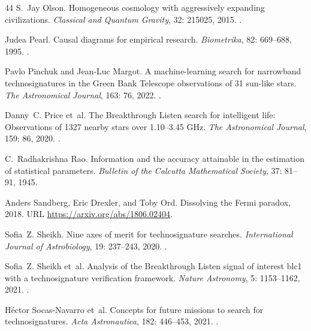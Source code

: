 \documentclass[11pt,a4paper]{article}
\begin{document}
\begin{thebibliography}{44}
S.~Jay Olson.
\newblock Homogeneous cosmology with aggressively expanding civilizations.
\newblock \emph{Classical and Quantum Gravity}, 32: 215025, 2015.
\newblock {}.

Judea Pearl.
\newblock Causal diagrams for empirical research.
\newblock \emph{Biometrika}, 82: 669--688, 1995.
\newblock {}.

Pavlo Pinchuk and Jean-Luc Margot.
\newblock A machine-learning search for narrowband technosignatures in the
  {Green Bank Telescope} observations of 31 sun-like stars.
\newblock \emph{The Astronomical Journal}, 163: 76, 2022.
\newblock {}.

Danny~C. Price et~al.
\newblock The {Breakthrough Listen} search for intelligent life: Observations
  of 1327 nearby stars over 1.10--3.45 {GHz}.
\newblock \emph{The Astronomical Journal}, 159: 86, 2020.
\newblock {}.

C.~Radhakrishna Rao.
\newblock Information and the accuracy attainable in the estimation of
  statistical parameters.
\newblock \emph{Bulletin of the Calcutta Mathematical Society}, 37:
  81--91, 1945.

Anders Sandberg, Eric Drexler, and Toby Ord.
\newblock Dissolving the {Fermi} paradox, 2018.
\newblock URL \url{https://arxiv.org/abs/1806.02404}.

Sofia~Z. Sheikh.
\newblock Nine axes of merit for technosignature searches.
\newblock \emph{International Journal of Astrobiology}, 19: 237--243,
  2020.
\newblock {}.

Sofia~Z. Sheikh et~al.
\newblock Analysis of the {Breakthrough Listen} signal of interest {blc1} with
  a technosignature verification framework.
\newblock \emph{Nature Astronomy}, 5: 1153--1162, 2021.
\newblock {}.

H{\'e}ctor Socas-Navarro et~al.
\newblock Concepts for future missions to search for technosignatures.
\newblock \emph{Acta Astronautica}, 182: 446--453, 2021.
\newblock {}.


\end{thebibliography}
\end{document}
